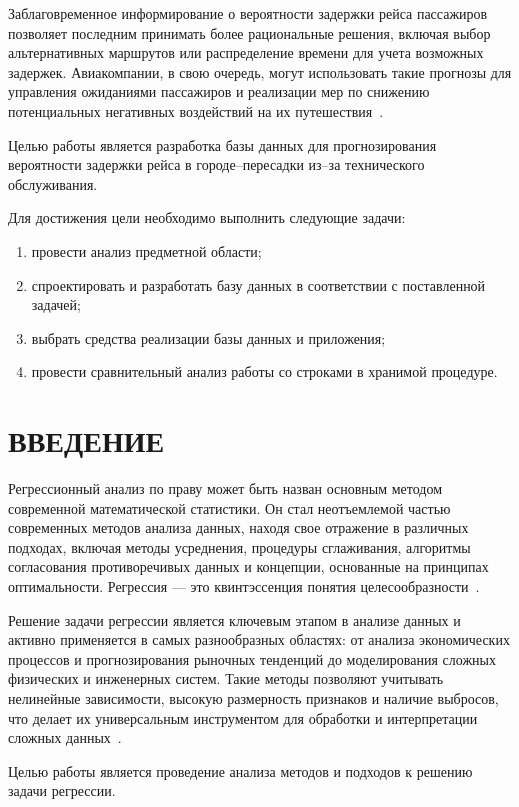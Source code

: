 Заблаговременное информирование о вероятности задержки рейса пассажиров позволяет последним принимать более рациональные решения, включая выбор альтернативных маршрутов или распределение времени для учета возможных задержек.
Авиакомпании, в свою очередь, могут использовать такие прогнозы для управления ожиданиями пассажиров и реализации мер по снижению потенциальных негативных воздействий на их путешествия~\cite{trt}.

Целью работы является разработка базы данных для прогнозирования вероятности задержки рейса в городе--пересадки из--за технического обслуживания.

Для достижения цели необходимо выполнить следующие задачи:
\begin{enumerate}[label=\arabic*)]
    \item провести анализ предметной области;
    \item спроектировать и разработать базу данных в соответствии с поставленной задачей;
    \item выбрать средства реализации базы данных и приложения;
    \item провести сравнительный анализ работы со строками в хранимой процедуре.
\end{enumerate}

\chapter*{ВВЕДЕНИЕ}

Регрессионный анализ по праву может быть назван основным методом современной математической статистики.
Он стал неотъемлемой частью современных методов анализа данных, находя свое отражение в различных подходах, включая методы усреднения, процедуры сглаживания, алгоритмы согласования противоречивых данных и концепции, основанные на принципах оптимальности.
Регрессия --- это квинтэссенция понятия целесообразности~\cite{norman}.

Решение задачи регрессии является ключевым этапом в анализе данных и активно применяется в самых разнообразных областях: от анализа экономических процессов и прогнозирования рыночных тенденций до моделирования сложных физических и инженерных систем.
Такие методы позволяют учитывать нелинейные зависимости, высокую размерность признаков и наличие выбросов, что делает их универсальным инструментом для обработки и интерпретации сложных данных~\cite{bishop}.

Целью работы является проведение анализа методов и подходов к решению задачи регрессии.

